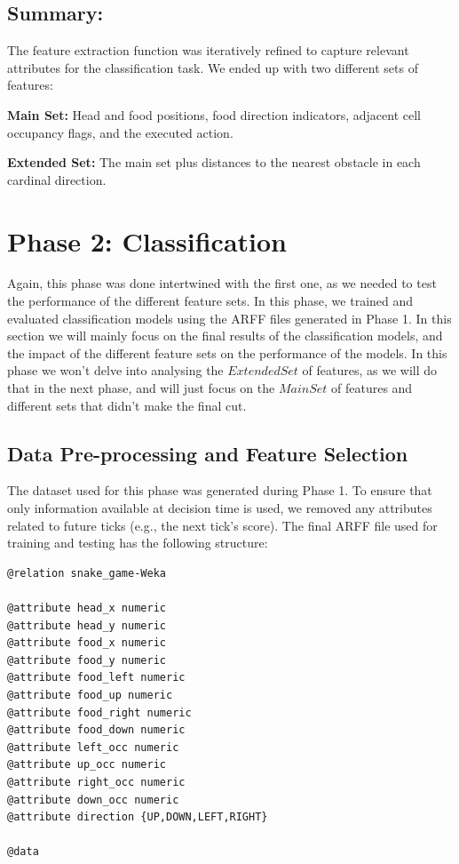 \documentclass[12pt,a4paper]{article}
\begin{document}
\subsection{Summary:}
The feature extraction function was iteratively refined to capture relevant attributes for the classification task. 
We ended up with two different sets of features:

\textbf{Main Set:} Head and food positions, food direction indicators, adjacent cell occupancy flags, and the executed action.

\textbf{Extended Set:} The main set plus distances to the nearest obstacle in each cardinal direction.


\section{Phase 2: Classification}

Again, this phase was done intertwined with the first one, as we needed to test the performance of the different feature sets.
In this phase, we trained and evaluated classification models using the ARFF files generated in Phase 1. 
In this section we will mainly focus on the final results of the classification models, and the impact of the different feature sets on the performance of the models.
In this phase we won't delve into analysing the $Extended Set$ of features, as we will do that in the next phase, and will just focus on the $Main Set$ of features and different sets that didn't make the final cut.

\subsection{Data Pre-processing and Feature Selection}

The dataset used for this phase was generated during Phase 1. 
To ensure that only information available at decision time is used, we removed any attributes related to future ticks (e.g., the next tick's score). 
The final ARFF file used for training and testing has the following structure:

\begin{verbatim}
@relation snake_game-Weka

@attribute head_x numeric
@attribute head_y numeric
@attribute food_x numeric
@attribute food_y numeric
@attribute food_left numeric
@attribute food_up numeric
@attribute food_right numeric
@attribute food_down numeric
@attribute left_occ numeric
@attribute up_occ numeric
@attribute right_occ numeric
@attribute down_occ numeric
@attribute direction {UP,DOWN,LEFT,RIGHT}

@data
\end{verbatim}
\end{document}
